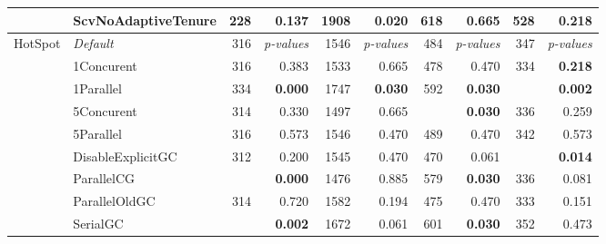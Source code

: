 \begin{table*}
{\begin{tabular}{cl|rr|rr|rr|rr}
& ScvNoAdaptiveTenure  & 228 & 0.137        & 1908       & \bf0.020     & 618        & 0.665        & 528        & 0.218          \\
\hline
\multirow{11}{*}{\sc HotSpot}        			
& \em Default       & 316 & \em p-values & 1546       & \em p-values & 484        & \em p-values & 347        & \em p-values   \\      
& 1Concurent        & 316 & 0.383        & 1533       & 0.665        & 478        & 0.470        & 334        & \bf 0.218      \\
& 1Parallel         & 334 & \bf 0.000    & 1747       & \bf 0.030    & 592        & \bf 0.030    & \best  320 & \bf 0.002    \\
& 5Concurent        & 314 & 0.330        & 1497       & 0.665        & \best  469 & \bf 0.030  & 336        & 0.259          \\
& 5Parallel         & 316 & 0.573        & 1546       & 0.470        & 489        & 0.470        & 342        & 0.573          \\
& DisableExplicitGC & 312       & 0.200        & 1545       & 0.470        & 470        & 0.061        & \best 325        & \bf 0.014      \\
& ParallelCG        & \best 300&  \bf 0.000  & 1476       & 0.885        & 579        & \bf 0.030    & 336        & 0.081          \\
& ParallelOldGC      & 314      	 & 0.720        & 1582       & 0.194        & 475        & 0.470        & 333        & 0.151          \\
& SerialGC          & \best 307       & \bf 0.002    & 1672       & 0.061        & 601        & \bf 0.030    & 352        & 0.473          \\
         
\bottomrule
		
		\end{tabular}
	}
\end{table*}